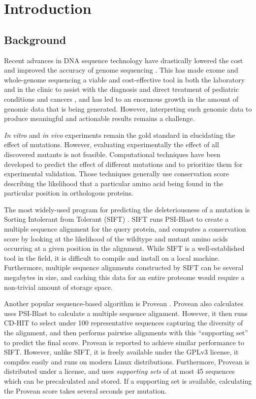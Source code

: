 
\chapter{Introduction}

\section{Background}

Recent advances in DNA sequence technology have drastically lowered the cost and improved the accuracy of genome sequencing \cite{wetterstrand_dna_2016}. This has made exome and whole-genome sequencing a viable and cost-effective tool in both the laboratory and in the clinic to assist with the diagnosis and direct treatment of pediatric conditions \cite{chrystoja_whole_2014} and cancers \cite{nik-zainal_landscape_2016}, and has led to an enormous growth in the amount of genomic data that is being generated. However, interpreting such genomic data to produce meaningful and actionable results remains a challenge.

\textit{In vitro} and \textit{in vivo} experiments remain the gold standard in elucidating the effect of mutations. However, evaluating experimentally the effect of all discovered mutants is not feasible. Computational techniques have been developed to predict the effect of different mutations and to prioritize them for experimental validation. Those techniques generally use conservation score describing the likelihood that a particular amino acid being found in the particular position in orthologous proteins.

The most widely-used program for predicting the deleteriousness of a mutation is Sorting Intolerant from Tolerant (SIFT) \cite{ng_sift:_2003}. SIFT runs PSI-Blast to create a multiple sequence alignment for the query protein, and computes a conservation score by looking at the likelihood of the wildtype and mutant amino acids occurring at a given position in the alignment. While SIFT is a well-established tool in the field, it is difficult to compile and install on a local machine. Furthermore, multiple sequence alignments constructed by SIFT can be several megabytes in size, and caching this data for an entire proteome would require a non-trivial amount of storage space.

Another popular sequence-based algorithm is Provean \cite{choi_predicting_2012}. Provean also calculates uses PSI-Blast to calculate a multiple sequence alignment. However, it then runs CD-HIT to select under 100 representative sequences capturing the diversity of the alignment, and then performs pairwise alignments with this ``supporting set'' to predict the final score. Provean is reported to achieve similar performance to SIFT. However, unlike SIFT, it is freely available under the GPLv3 license, it compiles easily and runs on modern Linux distributions. Furthermore, Provean is distributed under a  license, and uses \textit{supporting sets} of at most 45 sequences which can be precalculated and stored. If a supporting set is available, calculating the Provean score takes several seconds per mutation.

